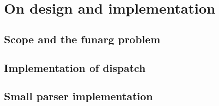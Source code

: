 \chapter{On design and implementation}
\section{Scope and the funarg problem}
\section{Implementation of dispatch}
\section{Small parser implementation}
